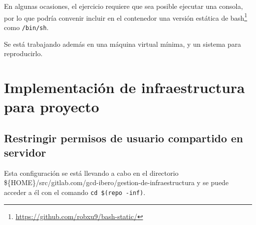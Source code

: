 \documentclass[
  12,
]{scrartcl}
\DeclareRobustCommand{\href}[2]{#2\footnote{\url{#1}}}
\begin{document}
En algunas ocasiones, el ejercicio requiere que sea posible ejecutar una
consola, por lo que podría convenir incluir en el contenedor
\href{https://github.com/robxu9/bash-static/}{una versión estática de
bash} como \texttt{/bin/sh}.

Se está trabajando además en una máquina virtual mínima, y un sistema
para reproducirlo.

\hypertarget{implementaciuxf3n-de-infraestructura-para-proyecto}{%
\section{Implementación de infraestructura para
proyecto}\label{implementaciuxf3n-de-infraestructura-para-proyecto}}

\hypertarget{restringir-permisos-de-usuario-compartido-en-servidor}{%
\subsection{Restringir permisos de usuario compartido en
servidor}\label{restringir-permisos-de-usuario-compartido-en-servidor}}

Esta configuración se está llevando a cabo en el directorio
\$\{HOME\}/src/gitlab.com/gcd-ibero/gestion-de-infraestructura y se
puede acceder a él con el comando \texttt{cd\ \$(repo\ -inf)}.
\end{document}
